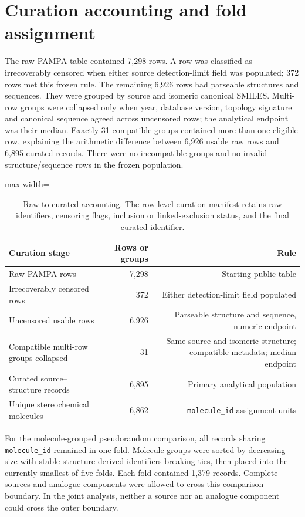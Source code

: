 \documentclass[10pt]{article}
\begin{document}
\section*{Curation accounting and fold assignment}

The raw PAMPA table contained 7,298 rows. A row was classified as irrecoverably censored when either source detection-limit field was populated; 372 rows met this frozen rule. The remaining 6,926 rows had parseable structures and sequences. They were grouped by source and isomeric canonical SMILES. Multi-row groups were collapsed only when year, database version, topology signature and canonical sequence agreed across uncensored rows; the analytical endpoint was their median. Exactly 31 compatible groups contained more than one eligible row, explaining the arithmetic difference between 6,926 usable raw rows and 6,895 curated records. There were no incompatible groups and no invalid structure/sequence rows in the frozen population.


\begin{table}[htbp]
\centering
\caption{Raw-to-curated accounting. The row-level curation manifest retains raw identifiers, censoring flags, inclusion or linked-exclusion status, and the final curated identifier.}
\begin{adjustbox}{max width=\textwidth}
\begin{tabular}{lrr}
\toprule
\textbf{Curation stage} & \textbf{Rows or groups} & \textbf{Rule} \\
\midrule
Raw PAMPA rows & 7,298 & Starting public table \\
Irrecoverably censored rows & 372 & Either detection-limit field populated \\
Uncensored usable rows & 6,926 & Parseable structure and sequence, numeric endpoint \\
Compatible multi-row groups collapsed & 31 & Same source and isomeric structure; compatible metadata; median endpoint \\
Curated source--structure records & 6,895 & Primary analytical population \\
Unique stereochemical molecules & 6,862 & \texttt{molecule\_\allowbreak{}id} assignment units \\
\bottomrule
\end{tabular}
\end{adjustbox}
\end{table}

For the molecule-grouped pseudorandom comparison, all records sharing \texttt{molecule\_\allowbreak{}id} remained in one fold. Molecule groups were sorted by decreasing size with stable structure-derived identifiers breaking ties, then placed into the currently smallest of five folds. Each fold contained 1,379 records. Complete sources and analogue components were allowed to cross this comparison boundary. In the joint analysis, neither a source nor an analogue component could cross the outer boundary.
\end{document}
